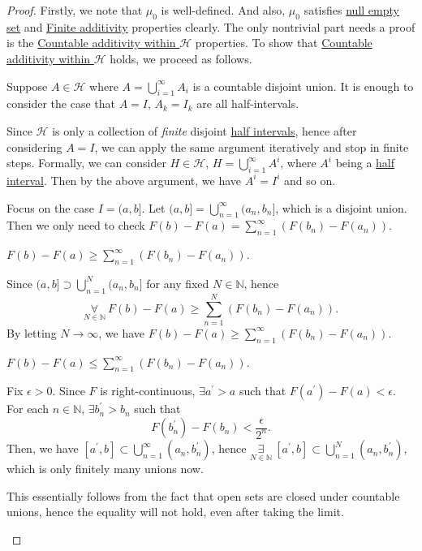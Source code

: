 \begin{proof}
	Firstly, we note that \(\mu _0\) is well-defined. And also, \(\mu _0\) satisfies \hyperref[def:pre-measure-null-empty-set]{null empty set} and
	\hyperref[def:pre-measure-finite-additivity]{Finite additivity} properties clearly. The only nontrivial part needs a proof is the
	\hyperref[def:pre-measure-countable-additivity-within-the-algebra]{Countable additivity within \(\mathcal{H}\)} properties.
	To show that \hyperref[def:pre-measure-countable-additivity-within-the-algebra]{Countable additivity within \(\mathcal{H}\)} holds, we proceed as follows.

	Suppose \(A\in \mathcal{H} \) where \(A = \bigcup_{i=1}^{\infty} A_{i}\) is a countable
	disjoint union. It is enough to consider the case that \(A = I\), \(A_{k} = I_{k}\) are all
	half-intervals.
	\begin{remark}
		Since \(\mathcal{H}\) is only a collection of \emph{finite} disjoint \hyperref[def:half-intervals]{half intervals}, hence
		after considering \(A = I\), we can apply the same argument iteratively and stop in finite steps. Formally, we can consider \(H\in \mathcal{H} \),
		\(H = \bigcup_{i=1}^{\infty} A^{i}\), where \(A^i\) being a \hyperref[def:half-intervals]{half interval}. Then by the above argument, we have \(A^i = I^i\) and so on.
	\end{remark}

	Focus on the case \(I = (a, b]\). Let \((a, b] = \bigcup_{n=1}^{\infty} (a_{n}, b_{n}]\),
	which is a disjoint union. Then we only need to check \(F(b) - F(a) = \sum_{n=1}^{\infty} \left(F(b_{n}) - F(a_{n})\right)\).
	\begin{claim}
		\(F(b) - F(a) \geq \sum_{n=1}^{\infty} (F(b_{n} ) - F(a_{n} ))\).
	\end{claim}
	\begin{explanation}
		Since \((a, b]\supset \bigcup_{n=1}^{N} (a_{n}, b_{n}]\) for any fixed \(N\in\mathbb{N} \), hence
		\[
			\underset{N\in\mathbb{N} }{\forall}\ F(b) - F(a) \geq \sum_{n=1}^{N} \left(F(b_{n}) - F(a_{n})\right).
		\]
		By letting \(N \to \infty\), we have \(F(b) - F(a) \geq \sum_{n=1}^{\infty} \left(F(b_{n}) - F(a_{n})\right)\).
	\end{explanation}
	\begin{claim}
		\(F(b) - F(a) \leq \sum_{n=1}^{\infty} (F(b_{n} ) - F(a_{n} ))\).
	\end{claim}
	\begin{explanation}
		Fix \(\epsilon >0\). Since \(F\) is right-continuous, \(\exists a ^\prime > a\) such that \(F(a ^\prime ) - F(a) <\epsilon\).
		For each \(n\in\mathbb{N} \), \(\exists b_{n} ^\prime > b_{n}\) such that
		\[
			F(b_{n} ^\prime ) - F(b_{n})<\frac{\epsilon }{2^n}.
		\]
		Then, we have \([a ^\prime , b] \subset \bigcup_{n=1}^{\infty} (a_{n}, b_{n} ^\prime )\), hence
		\(\underset{ N\in\mathbb{N}}{\exists}\ [a ^\prime , b]\subset \bigcup_{n=1}^{N} (a_{n}, b_{n} ^\prime )\),
		which is only finitely many unions now.
		\begin{remark}
			This essentially follows from the fact that open sets are closed under countable unions, hence the equality will not hold, even after taking the limit.
		\end{remark}


\end{explanation}
\end{proof}
